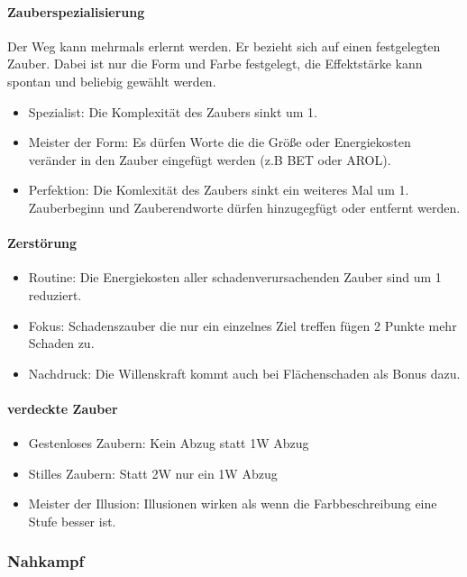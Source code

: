 \documentclass{article}
\begin{document}
\paragraph{Zauberspezialisierung}

Der Weg kann mehrmals erlernt werden. Er bezieht sich auf einen festgelegten Zauber. Dabei ist nur die Form und
Farbe festgelegt, die Effektstärke kann spontan und beliebig gewählt werden.

\begin{itemize}
\item Spezialist: Die Komplexität des Zaubers sinkt um 1.
\item Meister der Form: Es dürfen Worte die die Größe oder Energiekosten veränder in den Zauber eingefügt werden (z.B BET oder AROL).
\item Perfektion: Die Komlexität des Zaubers sinkt ein weiteres Mal um 1. Zauberbeginn und Zauberendworte dürfen hinzugegfügt oder entfernt werden.
\end{itemize}

\paragraph{Zerstörung}

\begin{itemize}
\item Routine: Die Energiekosten aller schadenverursachenden Zauber sind um 1 reduziert.
\item Fokus: Schadenszauber die nur ein einzelnes Ziel treffen fügen 2 Punkte mehr Schaden zu.
\item Nachdruck: Die Willenskraft kommt auch bei Flächenschaden als Bonus dazu.
\end{itemize}

\paragraph{verdeckte Zauber}

\begin{itemize}
\item Gestenloses Zaubern: Kein Abzug statt 1W Abzug
\item Stilles Zaubern: Statt 2W nur ein 1W Abzug
\item Meister der Illusion: Illusionen wirken als wenn die Farbbeschreibung eine Stufe besser ist.
\end{itemize}

\subsubsection{Nahkampf}
\end{document}
